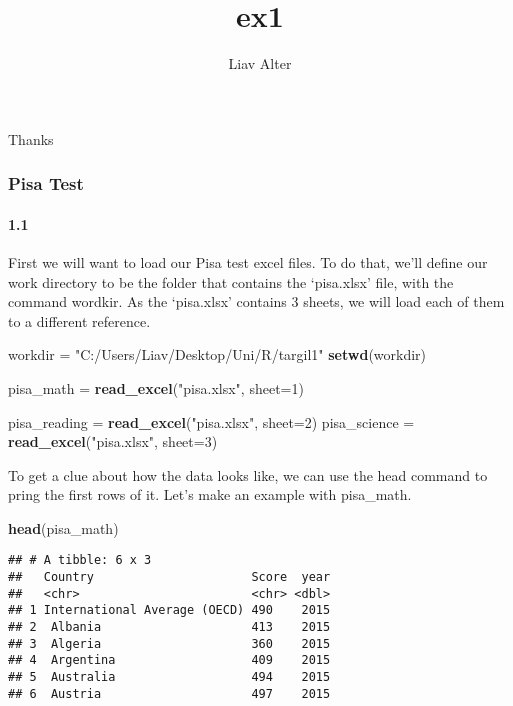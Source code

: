 \documentclass[]{article}
\title{ex1}
\author{Liav Alter}
\date{}
\newenvironment{Shaded}{\begin{snugshade}}{\end{snugshade}}
\newcommand{\KeywordTok}[1]{\textcolor[rgb]{0.13,0.29,0.53}{\textbf{#1}}}
\newcommand{\DataTypeTok}[1]{\textcolor[rgb]{0.13,0.29,0.53}{#1}}
\newcommand{\DecValTok}[1]{\textcolor[rgb]{0.00,0.00,0.81}{#1}}
\newcommand{\StringTok}[1]{\textcolor[rgb]{0.31,0.60,0.02}{#1}}
\newcommand{\NormalTok}[1]{#1}
\let\oldparagraph\paragraph
\renewcommand{\paragraph}[1]{\oldparagraph{#1}\mbox{}}
\begin{document}
\maketitle

Thanks

\subsubsection{Pisa Test}\label{pisa-test}

\paragraph{1.1}\label{section}

First we will want to load our Pisa test excel files. To do that, we'll
define our work directory to be the folder that contains the `pisa.xlsx'
file, with the command wordkir. As the `pisa.xlsx' contains 3 sheets, we
will load each of them to a different reference.

\begin{Shaded}
\begin{Highlighting}[]
\NormalTok{workdir =}\StringTok{ "C:/Users/Liav/Desktop/Uni/R/targil1"}
\KeywordTok{setwd}\NormalTok{(workdir)}

\NormalTok{pisa_math =}\StringTok{ }\KeywordTok{read_excel}\NormalTok{(}\StringTok{"pisa.xlsx"}\NormalTok{, }\DataTypeTok{sheet=}\DecValTok{1}\NormalTok{)}

\NormalTok{pisa_reading =}\StringTok{ }\KeywordTok{read_excel}\NormalTok{(}\StringTok{"pisa.xlsx"}\NormalTok{, }\DataTypeTok{sheet=}\DecValTok{2}\NormalTok{)}
\NormalTok{pisa_science =}\StringTok{ }\KeywordTok{read_excel}\NormalTok{(}\StringTok{"pisa.xlsx"}\NormalTok{, }\DataTypeTok{sheet=}\DecValTok{3}\NormalTok{)}
\end{Highlighting}
\end{Shaded}

To get a clue about how the data looks like, we can use the head command
to pring the first rows of it. Let's make an example with pisa\_math.

\begin{Shaded}
\begin{Highlighting}[]
\KeywordTok{head}\NormalTok{(pisa_math)}
\end{Highlighting}
\end{Shaded}

\begin{verbatim}
## # A tibble: 6 x 3
##   Country                      Score  year
##   <chr>                        <chr> <dbl>
## 1 International Average (OECD) 490    2015
## 2  Albania                     413    2015
## 3  Algeria                     360    2015
## 4  Argentina                   409    2015
## 5  Australia                   494    2015
## 6  Austria                     497    2015
\end{verbatim}
\end{document}
